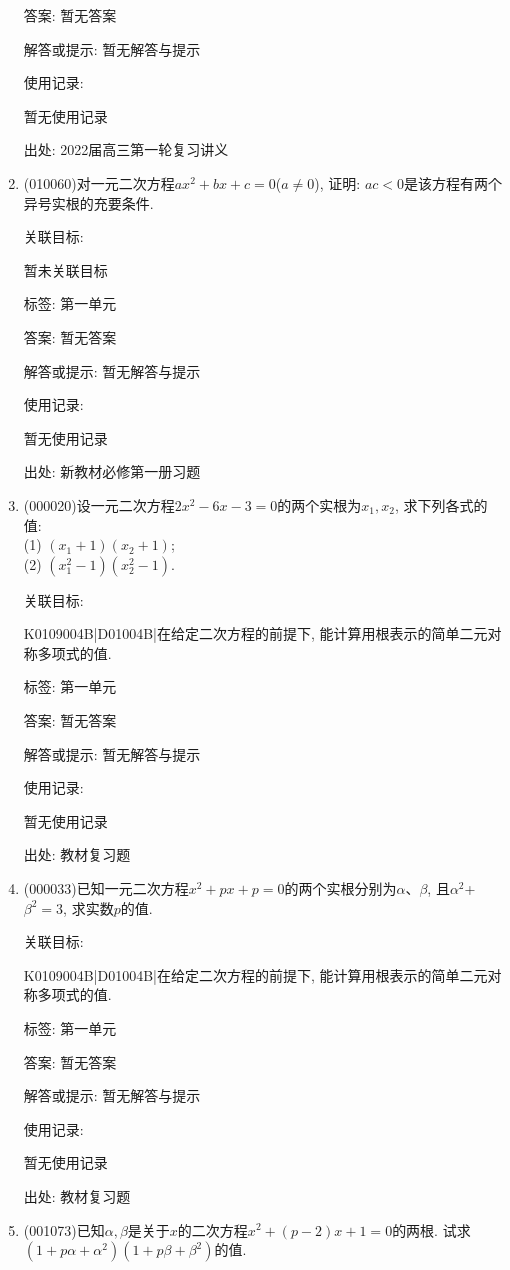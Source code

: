 \documentclass[10pt,a4paper]{article}
\begin{document}
\begin{enumerate}[1.]
答案: 暂无答案

解答或提示: 暂无解答与提示

使用记录:

暂无使用记录


出处: 2022届高三第一轮复习讲义
\item { (010060)}对一元二次方程$ax^2+bx+c=0$($a\ne 0$), 证明: $ac<0$是该方程有两个异号实根的充要条件.


关联目标:

暂未关联目标



标签: 第一单元

答案: 暂无答案

解答或提示: 暂无解答与提示

使用记录:

暂无使用记录


出处: 新教材必修第一册习题
\item { (000020)}设一元二次方程$2x^2-6x-3=0$的两个实根为$x_1,x_2$, 求下列各式的值:\\
(1) $(x_1+1)(x_2+1)$;\\
(2) $(x_1^2-1)(x_2^2-1)$.


关联目标:

K0109004B|D01004B|在给定二次方程的前提下, 能计算用根表示的简单二元对称多项式的值.



标签: 第一单元

答案: 暂无答案

解答或提示: 暂无解答与提示

使用记录:

暂无使用记录


出处: 教材复习题
\item { (000033)}已知一元二次方程$x^2+px+p=0$的两个实根分别为$\alpha$、$\beta$, 且$\alpha^2$+$\beta^2=3$, 求实数$p$的值.


关联目标:

K0109004B|D01004B|在给定二次方程的前提下, 能计算用根表示的简单二元对称多项式的值.



标签: 第一单元

答案: 暂无答案

解答或提示: 暂无解答与提示

使用记录:

暂无使用记录


出处: 教材复习题
\item { (001073)}已知$\alpha,\beta$是关于$x$的二次方程$x^2+(p-2)x+1=0$的两根. 试求$(1+p\alpha+\alpha^2)(1+p\beta+\beta^2)$的值.



\end{enumerate}
\end{document}
